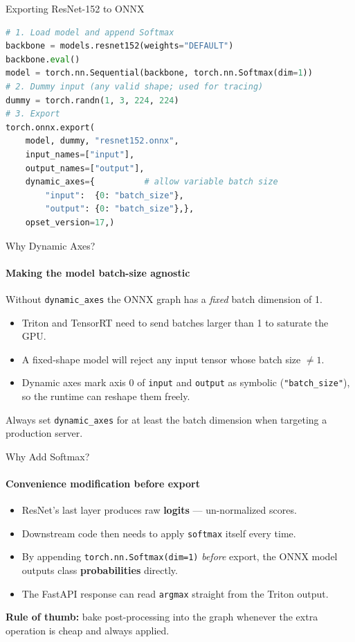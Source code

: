 \documentclass[aspectratio=169]{beamer}
\newcommand{\dbox}[1]{
\begin{mdframed}[roundcorner=3pt, backgroundcolor=yellow, linewidth=0]
\vspace{1mm}
{#1}
\vspace{1mm}
\end{mdframed}
}
\begin{document}
\begin{frame}[t,fragile]{Exporting ResNet-152 to ONNX}
\vspace{-0.6cm}
\begin{lstlisting}[language=Python, basicstyle=\footnotesize\ttfamily]
# 1. Load model and append Softmax
backbone = models.resnet152(weights="DEFAULT")
backbone.eval()
model = torch.nn.Sequential(backbone, torch.nn.Softmax(dim=1))
# 2. Dummy input (any valid shape; used for tracing)
dummy = torch.randn(1, 3, 224, 224)
# 3. Export
torch.onnx.export(
    model, dummy, "resnet152.onnx",
    input_names=["input"],
    output_names=["output"],
    dynamic_axes={          # allow variable batch size
        "input":  {0: "batch_size"},
        "output": {0: "batch_size"},},
    opset_version=17,)
\end{lstlisting}
\end{frame}

\begin{frame}[t]{Why Dynamic Axes?}
\framesubtitle{Making the model batch-size agnostic}
Without \texttt{dynamic\_axes} the ONNX graph has a \textit{fixed} batch dimension of 1.
\vspace{2mm}
\begin{itemize}
    \item Triton and TensorRT need to send batches larger than 1 to saturate the GPU.
    \item A fixed-shape model will reject any input tensor whose batch size $\neq 1$.
    \item Dynamic axes mark axis 0 of \texttt{input} and \texttt{output} as symbolic
          (\texttt{"batch\_size"}), so the runtime can reshape them freely.
\end{itemize}
\vspace{2mm}
\dbox{Always set \texttt{dynamic\_axes} for at least the batch dimension when targeting a production server.}
\end{frame}

\begin{frame}[t]{Why Add Softmax?}
\framesubtitle{Convenience modification before export}
\begin{itemize}
    \item ResNet's last layer produces raw \textbf{logits} --- un-normalized scores.
    \item Downstream code then needs to apply \texttt{softmax} itself every time.
    \item By appending \texttt{torch.nn.Softmax(dim=1)} \textit{before} export, the ONNX
          model outputs class \textbf{probabilities} directly.
    \item The FastAPI response can read \texttt{argmax} straight from the Triton output.
\end{itemize}
\vspace{2mm}
\textbf{Rule of thumb:} bake post-processing into the graph whenever the extra operation is cheap and always applied.
\end{frame}
\end{document}
